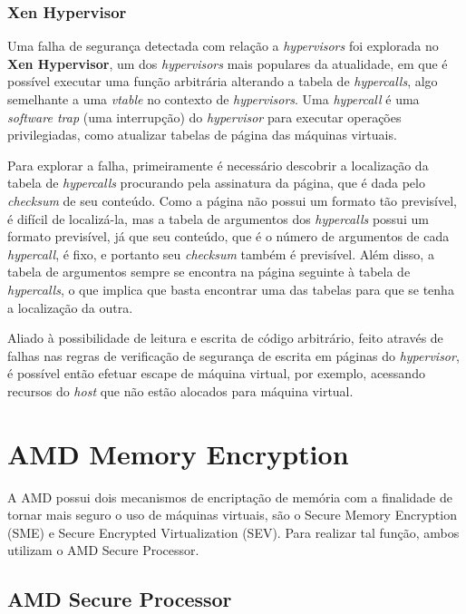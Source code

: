 \documentclass{report}
\begin{document}
\subsection{Xen Hypervisor}

Uma falha de segurança detectada com relação a \textit{hypervisors} foi
explorada no \textbf{Xen Hypervisor}, um dos \textit{hypervisors} mais
populares da atualidade, em que é possível executar uma função arbitrária
alterando a tabela de \textit{hypercalls}, algo semelhante a uma
\textit{vtable} no contexto de \textit{hypervisors}. Uma \textit{hypercall} é
uma \textit{software trap} (uma interrupção) do \textit{hypervisor} para
executar operações privilegiadas, como atualizar tabelas de página das máquinas
virtuais.

Para explorar a falha, primeiramente é necessário descobrir a localização da
tabela de \textit{hypercalls} procurando pela assinatura da página, que é dada
pelo \textit{checksum} de seu conteúdo. Como a página não possui um formato tão
previsível, é difícil de localizá-la, mas a tabela de argumentos dos
\textit{hypercalls} possui um formato previsível, já que seu conteúdo, que é o
número de argumentos de cada \textit{hypercall}, é fixo, e portanto seu
\textit{checksum} também é previsível. Além disso, a tabela de argumentos
sempre se encontra na página seguinte à tabela de \textit{hypercalls}, o que
implica que basta encontrar uma das tabelas para que se tenha a localização da
outra.

Aliado à possibilidade de leitura e escrita de código arbitrário, feito através
de falhas nas regras de verificação de segurança de escrita em páginas do
\textit{hypervisor}, é possível então efetuar escape de máquina virtual, por
exemplo, acessando recursos do \textit{host} que não estão alocados para
máquina virtual.

\chapter{AMD Memory Encryption}

A AMD possui dois mecanismos de encriptação de memória com a finalidade de
tornar mais seguro o uso de máquinas virtuais, são o Secure Memory Encryption
(SME) e Secure Encrypted Virtualization (SEV). Para realizar tal função, ambos
utilizam o AMD Secure Processor.

\section{AMD Secure Processor}
\end{document}
